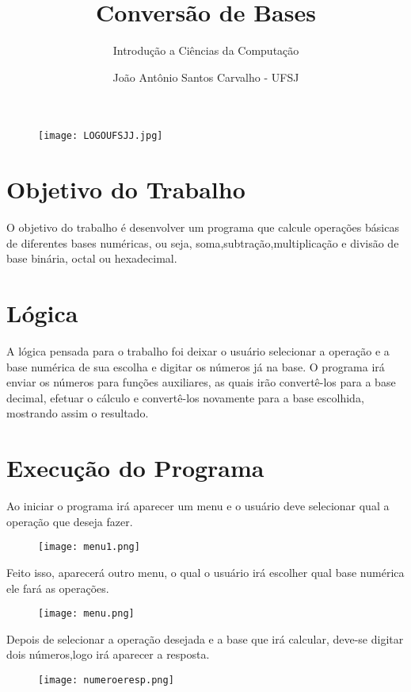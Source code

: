 \documentclass{article}
\title{Conversão de Bases}
\author{Introdução a Ciências da Computação}
\date{João Antônio Santos Carvalho - UFSJ}
\begin{document}
\maketitle

 \begin{center}
 \begin{figure}[h]
 \centering
 \texttt{[image: LOGOUFSJJ.jpg]}
 \end{figure}
 \end{center}
 
\section{Objetivo do Trabalho}
O objetivo do trabalho é desenvolver um programa que calcule operações básicas de diferentes bases numéricas, ou seja, soma,subtração,multiplicação e divisão de base binária, octal ou hexadecimal.
\section{Lógica}
\par A lógica pensada para o trabalho foi deixar o usuário selecionar a operação e a base numérica de sua escolha e digitar os números já na base. O programa irá enviar os números para funções auxiliares, as quais irão convertê-los para a base decimal, efetuar o cálculo e convertê-los novamente para a base escolhida, mostrando assim o resultado.
\newpage
\section{Execução do Programa}
\par Ao iniciar o programa irá aparecer um menu e o usuário deve selecionar qual a operação que deseja fazer.
 \begin{center}
 \begin{figure}[h]
 \centering
 \texttt{[image: menu1.png]}
 \end{figure}
 \end{center}
\par Feito isso, aparecerá outro menu, o qual o usuário irá escolher qual base numérica ele fará as operações.
 \begin{center}
 \begin{figure}[h]
 \centering
 \texttt{[image: menu.png]}
 \end{figure}
 \end{center}
 \par Depois de selecionar a operação desejada e a base que irá calcular, deve-se digitar dois números,logo irá aparecer a resposta.
  \begin{center}
 \begin{figure}[h]
 \centering
 \texttt{[image: numeroeresp.png]}
 \end{figure}
 \end{center}
 \newpage
\end{document}
